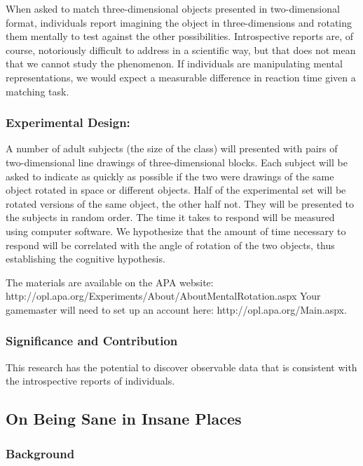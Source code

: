 When asked to match three-dimensional objects presented in two-dimensional format, individuals report imagining the object in three-dimensions and rotating them mentally to test against the other possibilities. Introspective reports are, of course, notoriously difficult to address in a scientific way, but that does not mean that we cannot study the phenomenon. If individuals are manipulating mental representations, we would expect a measurable difference in reaction time given a matching task.

\subsubsection{Experimental Design:}
\label{experimentaldesign:}

A number of adult subjects (the size of the class) will presented with pairs of two-dimensional line drawings of three-dimensional blocks. Each subject will be asked to indicate as quickly as possible if the two were drawings of the same object rotated in space or different objects. Half of the experimental set will be rotated versions of the same object, the other half not. They will be presented to the subjects in random order. The time it takes to respond will be measured using computer software. We hypothesize that the amount of time necessary to respond will be correlated with the angle of rotation of the two objects, thus establishing the cognitive hypothesis.

The materials are available on the APA website: http:\slash \slash opl.apa.org\slash Experiments\slash About\slash AboutMentalRotation.aspx Your gamemaster will need to set up an account here: http:\slash \slash opl.apa.org\slash Main.aspx.

\subsubsection{Significance and Contribution}
\label{significanceandcontribution}

This research has the potential to discover observable data that is consistent with the introspective reports of individuals. 

\subsection{On Being Sane in Insane Places}
\label{onbeingsaneininsaneplaces}

\subsubsection{Background}
\label{background}

